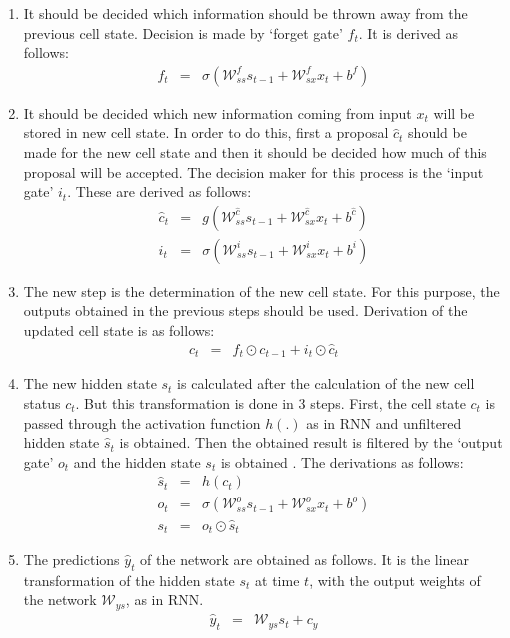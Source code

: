 \begin{enumerate}
    \item It should be decided which information should be thrown away from the previous cell state. Decision is made by `forget gate' $f_t$. 
    It is derived as follows:
    \begin{eqnarray}
        f_t &=& \sigma\left(\mathcal{W}^{f}_{ss} s_{t-1} + \mathcal{W}_{sx}^{f} x_t + b^f \right)
    \end{eqnarray}
    \item It should be decided which new information coming from input $x_t$ will be stored in new cell state. In order to do this, first a proposal $\hat{c}_t$ should be made for the new cell state and then it should be decided how much of this proposal will be accepted. The decision maker for this process is the `input gate' $i_t$. These are derived as follows:
    \begin{eqnarray}
        \hat{c}_t &=& g\left(\mathcal{W}^{\hat{c}}_{ss} s_{t-1} + \mathcal{W}_{sx}^{\hat{c}} x_t + b^{\hat{c}} \right) \\
        i_t &=& \sigma\left(\mathcal{W}^{i}_{ss} s_{t-1} + \mathcal{W}_{sx}^{i} x_t + b^i \right)
    \end{eqnarray}
    \item The new step is the determination of the new cell state. For this purpose, the outputs obtained in the previous steps should be used. Derivation of the updated cell state is as follows:
    \begin{eqnarray}
        c_t &=& f_t \odot c_{t-1} + i_t \odot \hat{c}_t
    \end{eqnarray}
    \item The new hidden state $s_t$ is calculated after the calculation of the new cell status $c_t$. But this transformation is done in 3 steps. First, the cell state $c_t$ is passed through the activation function $h(.)$ as in RNN and unfiltered hidden state $\hat{s}_t$ is obtained. Then the obtained result is filtered by the `output gate' $o_t$ and the hidden state $s_t$ is obtained . The derivations as follows:
    \begin{eqnarray}
        \hat{s}_t &=& h\left(c_{t}\right) \\
        o_t &=& \sigma\left(\mathcal{W}^{o}_{ss} s_{t-1} + \mathcal{W}_{sx}^{o} x_t + b^o \right) \\
        s_t &=& o_t \odot \hat{s}_t
    \end{eqnarray}
    \item The predictions $\hat{y}_{t}$ of the network are obtained as follows. It is the linear transformation of the hidden state $s_t$ at time $t$, with the output weights of the network $\mathcal{W}_{ys}$, as in RNN.
    \begin{eqnarray}
        \hat{y}_{t} &=& \mathcal{W}_{ys}s_t + c_y
    \end{eqnarray}
\end{enumerate}

